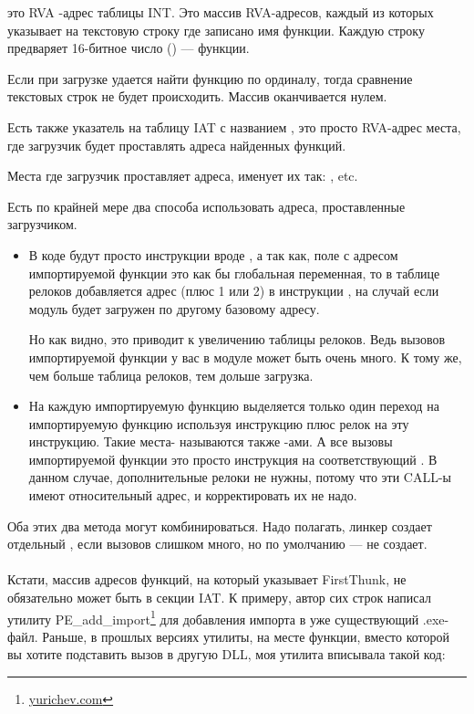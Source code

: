  это \ac{RVA} -адрес таблицы \ac{INT}.
Это массив \ac{RVA}-адресов, каждый из которых указывает на текстовую строку где записано имя функции. 
Каждую строку предваряет 16-битное число () ---  функции.

Если при загрузке удается найти функцию по ординалу, тогда сравнение текстовых строк не будет происходить.
Массив оканчивается нулем.

Есть также указатель на таблицу \ac{IAT} с названием , это просто \ac{RVA}-адрес места, где загрузчик будет проставлять адреса найденных функций.

Места где загрузчик проставляет адреса, \IDA именует их так: , etc.

Есть по крайней мере два способа использовать адреса, проставленные загрузчиком.

\begin{itemize}
\item
В коде будут просто инструкции вроде , а так как, поле с адресом импортируемой функции это как бы глобальная переменная, 
то в таблице релоков добавляется адрес (плюс 1 или 2) в инструкции ,
на случай если модуль будет загружен по другому базовому адресу.

Но как видно, это приводит к увеличению таблицы релоков.
Ведь вызовов импортируемой функции у вас в модуле может быть очень много.
К тому же, чем больше таблица релоков, тем дольше загрузка.

\item
На каждую импортируемую функцию выделяется только один переход на импортируемую функцию используя
инструкцию \JMP плюс релок на эту инструкцию.
Такие места- называются также -ами.
А все вызовы импортируемой функции это просто инструкция \CALL на соответствующий .
В данном случае, дополнительные релоки не нужны, потому что эти CALL-ы имеют относительный адрес,
и корректировать их не надо.
\end{itemize}

Оба этих два метода могут комбинироваться.
Надо полагать, линкер создает отдельный , если вызовов слишком много, но по умолчанию --- не создает. \\
\\
Кстати, массив адресов функций, на который указывает FirstThunk,
не обязательно может быть в секции \ac{IAT}.
К примеру, автор сих строк написал утилиту
PE\_add\_import\footnote{\href{http://go.yurichev.com/17049}{yurichev.com}} 
для добавления импорта в уже существующий .exe-файл.
Раньше, в прошлых версиях утилиты, на месте функции, вместо которой вы хотите подставить вызов в другую DLL,
моя утилита вписывала такой код:

